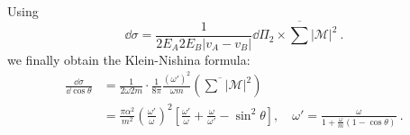 Using 
\[
\dd\sigma =\frac{1}{2E_A 2E_B|v_A-v_B|}\dd \Pi_2 \times \overline{\sum}|\mathcal M|^2~.
\]
we finally obtain the Klein-Nishina formula:
\begin{equation}\begin{aligned}
\frac{\dd \sigma}{\dd \cos\theta} &= \frac{1}{2\omega 2m}\cdot \frac{1}{8\pi} \frac{(\omega')^2}{\omega m }
\left(\overline{\sum}|\mathcal M|^2\right)\\
&=\frac{\pi \alpha^2}{m^2}\left(\frac{\omega'}{\omega}\right)^2\left[\frac{\omega'}{\omega}+\frac{\omega}{\omega'}-\sin^2\theta\right],\quad \omega'=\frac{\omega}{1+\frac{\omega}{m}(1-\cos\theta)}~.
\end{aligned}\end{equation}